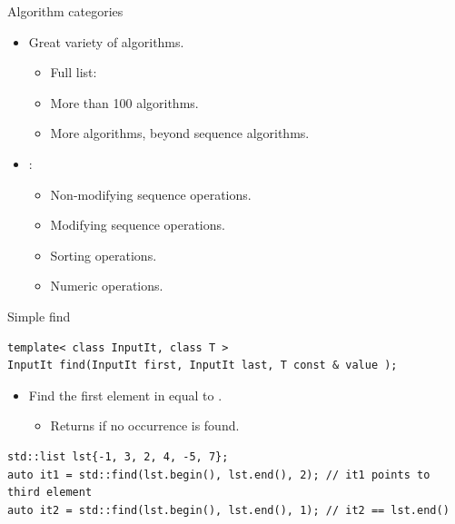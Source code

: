 \begin{frame}[t,fragile]{Algorithm categories}
\begin{itemize}
  \item Great variety of algorithms.
    \begin{itemize}
      \item Full list: 
      \item More than 100 algorithms.
      \item More algorithms, beyond sequence algorithms.
    \end{itemize}

  \item {}:
    \begin{itemize}
      \item Non-modifying sequence operations.
      \item Modifying sequence operations.
      \item Sorting operations.
      \item Numeric operations.
    \end{itemize}
\end{itemize}
\end{frame}

\begin{frame}[t,fragile]{Simple find}
\begin{lstlisting}
template< class InputIt, class T >
InputIt find(InputIt first, InputIt last, T const & value );
\end{lstlisting}

\begin{itemize}
  \item Find the first element in \cppcode{[first,last)} equal to
        .
    \begin{itemize}
      \item Returns  if no occurrence is found.
    \end{itemize}
\end{itemize}

\begin{lstlisting}
std::list lst{-1, 3, 2, 4, -5, 7};
auto it1 = std::find(lst.begin(), lst.end(), 2); // it1 points to third element
auto it2 = std::find(lst.begin(), lst.end(), 1); // it2 == lst.end()
\end{lstlisting}

\end{frame}

